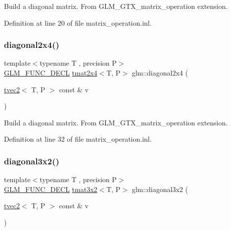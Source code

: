 Build a diagonal matrix. From G\+L\+M\+\_\+\+G\+T\+X\+\_\+matrix\+\_\+operation extension. 

Definition at line 20 of file matrix\+\_\+operation.\+inl.

\mbox{\label{group__gtx__matrix__operation_ga49b37c819cf6dd8e35112ed1a13d45a3}} 
\subsubsection{\texorpdfstring{diagonal2x4()}{diagonal2x4()}}
{\footnotesize\ttfamily template$<$typename T , precision P$>$ \\
\mbox{\hyperlink{setup_8hpp_ab2d052de21a70539923e9bcbf6e83a51}{G\+L\+M\+\_\+\+F\+U\+N\+C\+\_\+\+D\+E\+CL}} \mbox{\hyperlink{structglm_1_1tmat2x4}{tmat2x4}}$<$T, P$>$ glm\+::diagonal2x4 (\begin{DoxyParamCaption}\item[{\mbox{\hyperlink{structglm_1_1tvec2}{tvec2}}$<$ T, P $>$ const \&}]{v }\end{DoxyParamCaption})}

Build a diagonal matrix. From G\+L\+M\+\_\+\+G\+T\+X\+\_\+matrix\+\_\+operation extension. 

Definition at line 32 of file matrix\+\_\+operation.\+inl.

\mbox{\label{group__gtx__matrix__operation_ga586e1ced91fd8a7c414186a200f13532}} 
\subsubsection{\texorpdfstring{diagonal3x2()}{diagonal3x2()}}
{\footnotesize\ttfamily template$<$typename T , precision P$>$ \\
\mbox{\hyperlink{setup_8hpp_ab2d052de21a70539923e9bcbf6e83a51}{G\+L\+M\+\_\+\+F\+U\+N\+C\+\_\+\+D\+E\+CL}} \mbox{\hyperlink{structglm_1_1tmat3x2}{tmat3x2}}$<$T, P$>$ glm\+::diagonal3x2 (\begin{DoxyParamCaption}\item[{\mbox{\hyperlink{structglm_1_1tvec2}{tvec2}}$<$ T, P $>$ const \&}]{v }\end{DoxyParamCaption})}

